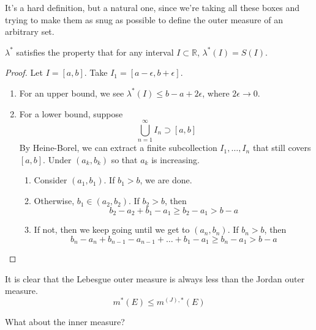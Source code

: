   It's a hard definition, but a natural one, since we're taking all these boxes and trying to make them as snug as possible to define the outer measure of an arbitrary set. 

  \begin{theorem}
    $\lambda^\ast$ satisfies the property that for any interval $I \subset \mathbb{R}$, $\lambda^\ast (I) = S(I)$. 
  \end{theorem}
  \begin{proof}
    Let $I = [a, b]$. Take $I_1 = [a - \epsilon, b + \epsilon]$. 
    \begin{enumerate}
      \item For an upper bound, we see $\lambda^\ast (I) \leq b - a + 2\epsilon$, where $2 \epsilon \to 0$. 
      \item For a lower bound, suppose 
      \begin{equation}
        \bigcup_{n=1}^\infty I_n \supset [a, b] 
      \end{equation}
      By Heine-Borel, we can extract a finite subcollection $I_1, \ldots, I_n$ that still covers $[a, b]$. Under $(a_k, b_k)$ so that $a_k$ is increasing. 
      \begin{enumerate}
        \item Consider $(a_1, b_1)$. If $b_1 > b$, we are done. 
        \item Otherwise, $b_1 \in (a_2, b_2)$. If $b_2 > b$, then 
        \begin{equation}
          b_2 - a_2 + b_1 - a_1 \geq b_2 - a_1 > b - a
        \end{equation}
        \item If not, then we keep going until we get to $(a_n, b_n)$. If $b_n > b$, then 
          \begin{equation}
            b_n - a_n + b_{n-1} - a_{n-1} + \ldots + b_1 - a_1 \geq b_n - a_1  > b - a
          \end{equation}
      \end{enumerate}
    \end{enumerate}
  \end{proof}

  It is clear that the Lebesgue outer measure is always less than the Jordan outer measure. 
  \begin{equation}
    m^\ast (E) \leq m^{(J), \ast} (E) 
  \end{equation}

  What about the inner measure? 

